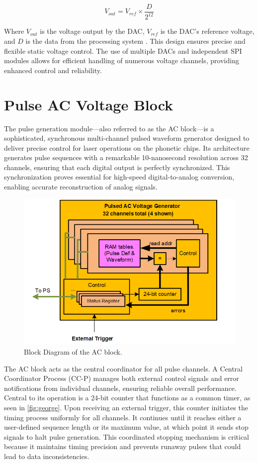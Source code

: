 \begin{equation}
V_{out} = V_{ref} \times \frac{D}{2^{12}}
\end{equation}

Where $V_{out}$ is the voltage output by the DAC, $V_{ref}$ is the DAC's reference voltage, and $D$ is the data from the processing system \cite{ad5628}. This design ensures precise and flexible static voltage control. The use of multiple DACs and independent SPI modules allows for efficient handling of numerous voltage channels, providing enhanced control and reliability.

\section{Pulse AC Voltage Block}

The pulse generation module—also referred to as the AC block—is a sophisticated, synchronous multi-channel pulsed waveform generator designed to deliver precise control for laser operations on the phonetic chips. Its architecture generates pulse sequences with a remarkable 10-nanosecond resolution across 32 channels, ensuring that each digital output is perfectly synchronized. This synchronization proves essential for high-speed digital-to-analog conversion, enabling accurate reconstruction of analog signals.
\begin{figure}[h]
    \centering
    \includegraphics[width=0.8\linewidth]{figures/5.3.png}
    \caption{Block Diagram of the AC block.}
    \label{fig:george}
\end{figure}
The AC block acts as the central coordinator for all pulse channels. A Central Coordinator Process (CC-P) manages both external control signals and error notifications from individual channels, ensuring reliable overall performance. Central to its operation is a 24-bit counter that functions as a common timer, as seen in \autoref{fig:george}. Upon receiving an external trigger, this counter initiates the timing process uniformly for all channels. It continues until it reaches either a user-defined sequence length or its maximum value, at which point it sends stop signals to halt pulse generation. This coordinated stopping mechanism is critical because it maintains timing precision and prevents runaway pulses that could lead to data inconsistencies.

